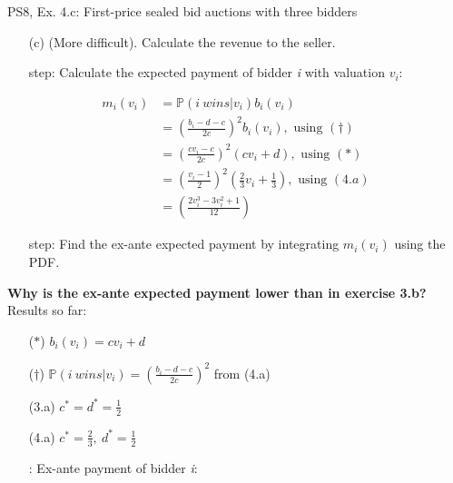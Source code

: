\begin{frame}{PS8, Ex. 4.c: First-price sealed bid auctions with three bidders}
    \begin{itemize}
      \item[(c)] (More difficult). Calculate the revenue to the seller.
    \end{itemize}
    \vspace{-8pt}
    \begin{multicols}{2}
      \begin{itemize}
        \item[\nth{1} step:] Calculate the expected payment of bidder \textit{i} with valuation $v_i$:
      \end{itemize}
      \vspace{-10pt}
      \begin{align*}
        m_i(v_i)&=\mathbb{P}(i\ wins|v_i)b_i(v_i)\\
                &=\left(\frac{b_i-d-c}{2c}\right)^2b_i(v_i),\text{ using }(\dagger)\\
                &=\left(\frac{cv_i-c}{2c}\right)^2(cv_i+d),\text{ using }(*)\\
                &=\left(\frac{v_i-1}{2}\right)^2\left(\frac{2}{3}v_i+\frac{1}{3}\right),\text{ using }(4.a)\\
                &=\left(\frac{2v_i^3-3v_i^2+1}{12}\right)
      \end{align*}
      \vspace{-10pt}
      \begin{itemize}
        \item[\nth{2} step:] Find the ex-ante expected payment by integrating $m_i(v_i)$ using the PDF.
      \end{itemize}
      \vspace{-4pt}
      \textbf{Why is the ex-ante expected payment lower than in exercise 3.b?}
      \vfill\null\columnbreak
      Results so far:
      \vspace{-6pt}
      \begin{itemize}
        \item[($*$)] $b_i(v_i) = cv_i+d$
        \item[($\dagger$)] $\mathbb{P}(i\ wins|v_i)=\left(\frac{b_i-d-c}{2c}\right)^2$ from (4.a)
        \item[(3.a)] $c^*=d^*=\frac{1}{2}$
        \item[(4.a)] $c^*=\frac{2}{3},\ d^*=\frac{1}{2}$
        \item[\nth{2}:] Ex-ante payment of bidder \textit{i}:

\end{itemize}
\end{multicols}
\end{frame}
